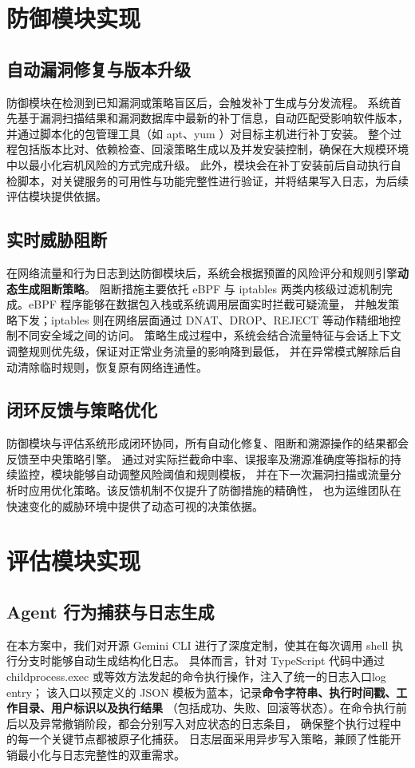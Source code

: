 \documentclass[lang=cn,10pt]{elegantbook}
\begin{document}
\section{防御模块实现}

\subsection{自动漏洞修复与版本升级}  
防御模块在检测到已知漏洞或策略盲区后，会触发补丁生成与分发流程。
系统首先基于漏洞扫描结果和漏洞数据库中最新的补丁信息，自动匹配受影响软件版本，
并通过脚本化的包管理工具（如 apt、yum ）对目标主机进行补丁安装。
整个过程包括版本比对、依赖检查、回滚策略生成以及并发安装控制，确保在大规模环境中以最小化宕机风险的方式完成升级。
此外，模块会在补丁安装前后自动执行自检脚本，对关键服务的可用性与功能完整性进行验证，并将结果写入日志，为后续评估模块提供依据。

\subsection{实时威胁阻断}  
在网络流量和行为日志到达防御模块后，系统会根据预置的风险评分和规则引擎\textbf{动态生成阻断策略}。
阻断措施主要依托 eBPF 与 iptables 两类内核级过滤机制完成。eBPF 程序能够在数据包入栈或系统调用层面实时拦截可疑流量，
并触发策略下发；iptables 则在网络层面通过 DNAT、DROP、REJECT 等动作精细地控制不同安全域之间的访问。
策略生成过程中，系统会结合流量特征与会话上下文调整规则优先级，保证对正常业务流量的影响降到最低，
并在异常模式解除后自动清除临时规则，恢复原有网络连通性。

\subsection{闭环反馈与策略优化}  
防御模块与评估系统形成闭环协同，所有自动化修复、阻断和溯源操作的结果都会反馈至中央策略引擎。
通过对实际拦截命中率、误报率及溯源准确度等指标的持续监控，模块能够自动调整风险阈值和规则模板，
并在下一次漏洞扫描或流量分析时应用优化策略。该反馈机制不仅提升了防御措施的精确性，
也为运维团队在快速变化的威胁环境中提供了动态可视的决策依据。




\section{评估模块实现}

\subsection{Agent 行为捕获与日志生成}
在本方案中，我们对开源 Gemini CLI 进行了深度定制，使其在每次调用 shell 执行分支时能够自动生成结构化日志。
具体而言，针对 TypeScript 代码中通过 childprocess.exec 或等效方法发起的命令执行操作，注入了统一的日志入口log entry；
该入口以预定义的 JSON 模板为蓝本，记录\textbf{命令字符串、执行时间戳、工作目录、用户标识以及执行结果}
（包括成功、失败、回滚等状态）。在命令执行前后以及异常撤销阶段，都会分别写入对应状态的日志条目，
确保整个执行过程中的每一个关键节点都被原子化捕获。
日志层面采用异步写入策略，兼顾了性能开销最小化与日志完整性的双重需求。
\end{document}

